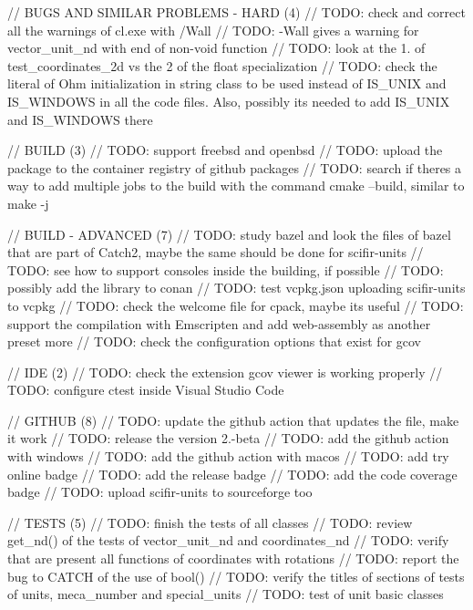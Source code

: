 // BUGS AND SIMILAR PROBLEMS -\/ HARD (4) // TODO\+: check and correct all the warnings of cl.\+exe with /\+Wall // TODO\+: -\/Wall gives a warning for vector\+\_\+unit\+\_\+nd with end of non-\/void function // TODO\+: look at the 1. of test\+\_\+coordinates\+\_\+2d vs the 2 of the float specialization // TODO\+: check the literal of Ohm initialization in string class to be used instead of IS\+\_\+\+UNIX and IS\+\_\+\+WINDOWS in all the code files. Also, possibly it\textquotesingle{}s needed to add IS\+\_\+\+UNIX and IS\+\_\+\+WINDOWS there

// BUILD (3) // TODO\+: support freebsd and openbsd // TODO\+: upload the package to the container registry of github packages // TODO\+: search if there\textquotesingle{}s a way to add multiple jobs to the build with the command cmake --build, similar to make -\/j

// BUILD -\/ ADVANCED (7) // TODO\+: study bazel and look the files of bazel that are part of Catch2, maybe the same should be done for scifir-\/units // TODO\+: see how to support consoles inside the building, if possible // TODO\+: possibly add the library to conan // TODO\+: test vcpkg.\+json uploading scifir-\/units to vcpkg // TODO\+: check the welcome file for cpack, maybe it\textquotesingle{}s useful // TODO\+: support the compilation with Emscripten and add web-\/assembly as another preset more // TODO\+: check the configuration options that exist for gcov

// IDE (2) // TODO\+: check the extension gcov viewer is working properly // TODO\+: configure ctest inside Visual Studio Code

// GITHUB (8) // TODO\+: update the github action that updates the  file, make it work // TODO\+: release the version 2.-\/beta // TODO\+: add the github action with windows // TODO\+: add the github action with macos // TODO\+: add try online badge // TODO\+: add the release badge // TODO\+: add the code coverage badge // TODO\+: upload scifir-\/units to sourceforge too

// TESTS (5) // TODO\+: finish the tests of all classes // TODO\+: review get\+\_\+nd() of the tests of vector\+\_\+unit\+\_\+nd and coordinates\+\_\+nd // TODO\+: verify that are present all functions of coordinates with rotations // TODO\+: report the bug to CATCH of the use of bool() // TODO\+: verify the titles of sections of tests of units, meca\+\_\+number and special\+\_\+units // TODO\+: test of unit basic classes

